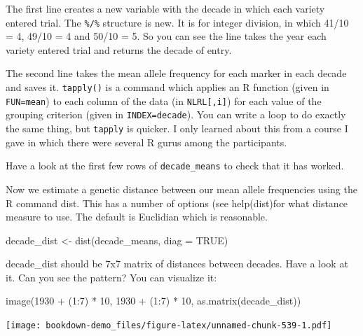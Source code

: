 \documentclass[
]{book}
\newenvironment{Shaded}{\begin{snugshade}}{\end{snugshade}}
\newcommand{\AttributeTok}[1]{\textcolor[rgb]{0.77,0.63,0.00}{#1}}
\newcommand{\ConstantTok}[1]{\textcolor[rgb]{0.00,0.00,0.00}{#1}}
\newcommand{\DecValTok}[1]{\textcolor[rgb]{0.00,0.00,0.81}{#1}}
\newcommand{\FunctionTok}[1]{\textcolor[rgb]{0.00,0.00,0.00}{#1}}
\newcommand{\NormalTok}[1]{#1}
\newcommand{\OtherTok}[1]{\textcolor[rgb]{0.56,0.35,0.01}{#1}}
\newcommand{\SpecialCharTok}[1]{\textcolor[rgb]{0.00,0.00,0.00}{#1}}
\begin{document}
The first line creates a new variable with the decade in which each variety entered trial. The \texttt{\%/\%} structure is new. It is for integer division, in which 41/10 = 4, 49/10 = 4 and 50/10 = 5. So you can see the line takes the year each variety entered trial and returns the decade of entry.

The second line takes the mean allele frequency for each marker in each decade and saves
it. \texttt{tapply()} is a command which applies an R function (given in \texttt{FUN=mean}) to each column
of the data (in \texttt{NLRL{[},i{]}}) for each value of the grouping criterion (given in \texttt{INDEX=decade}). You can write a loop to do exactly the same thing, but \texttt{tapply} is quicker. I only learned about this from a course I gave in which there were several R gurus among the participants.

Have a look at the first few rows of \texttt{decade\_means} to check that it has worked.

Now we estimate a genetic distance between our mean allele frequencies using the R command dist. This has a number of options (see help(dist)for what distance measure to use. The default is Euclidian which is reasonable.

\begin{Shaded}
\begin{Highlighting}[]
\NormalTok{decade\_dist }\OtherTok{\textless{}{-}} \FunctionTok{dist}\NormalTok{(decade\_means, }\AttributeTok{diag =} \ConstantTok{TRUE}\NormalTok{)}
\end{Highlighting}
\end{Shaded}

decade\_dist should be 7x7 matrix of distances between decades. Have a look at it. Can you
see the pattern? You can visualize it:

\begin{Shaded}
\begin{Highlighting}[]
\FunctionTok{image}\NormalTok{(}\DecValTok{1930} \SpecialCharTok{+}\NormalTok{ (}\DecValTok{1}\SpecialCharTok{:}\DecValTok{7}\NormalTok{) }\SpecialCharTok{*} \DecValTok{10}\NormalTok{, }\DecValTok{1930} \SpecialCharTok{+}\NormalTok{ (}\DecValTok{1}\SpecialCharTok{:}\DecValTok{7}\NormalTok{) }\SpecialCharTok{*} \DecValTok{10}\NormalTok{, }\FunctionTok{as.matrix}\NormalTok{(decade\_dist))}
\end{Highlighting}
\end{Shaded}

\texttt{[image: bookdown-demo\_files/figure-latex/unnamed-chunk-539-1.pdf]}
\end{document}
